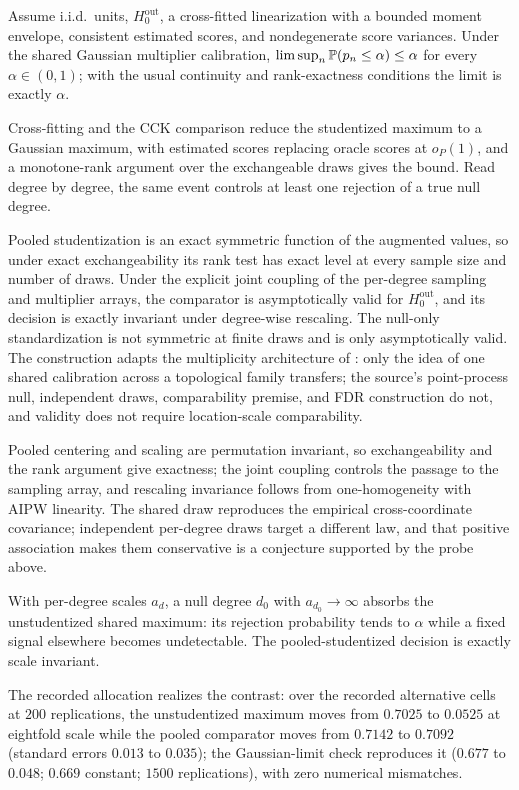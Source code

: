 \begin{theorem}
\label{thm:mult-fwer}
Assume i.i.d.\ units, $H_0^{\mathrm{out}}$, a cross-fitted linearization with a bounded moment envelope, consistent estimated scores, and nondegenerate score variances. Under the shared Gaussian multiplier calibration, $\limsup_n\mathbb{P}(p_n\le\alpha)\le\alpha$ for every $\alpha\in(0,1)$; with the usual continuity and rank-exactness conditions the limit is exactly $\alpha$.
\end{theorem}
Cross-fitting and the CCK comparison reduce the studentized maximum to a Gaussian maximum, with estimated scores replacing oracle scores at $o_P(1)$, and a monotone-rank argument over the exchangeable draws gives the bound. Read degree by degree, the same event controls at least one rejection of a true null degree.

\begin{theorem}
\label{thm:mult-comparator}
Pooled studentization is an exact symmetric function of the augmented values, so under exact exchangeability its rank test has exact level at every sample size and number of draws. Under the explicit joint coupling of the per-degree sampling and multiplier arrays, the comparator is asymptotically valid for $H_0^{\mathrm{out}}$, and its decision is exactly invariant under degree-wise rescaling. The null-only standardization is not symmetric at finite draws and is only asymptotically valid. The construction adapts the multiplicity architecture of \citet{vejdemo_mukherjee_2022}: only the idea of one shared calibration across a topological family transfers; the source's point-process null, independent draws, comparability premise, and FDR construction do not, and validity does not require location-scale comparability.
\end{theorem}
Pooled centering and scaling are permutation invariant, so exchangeability and the rank argument give exactness; the joint coupling controls the passage to the sampling array, and rescaling invariance follows from one-homogeneity with AIPW linearity. The shared draw reproduces the empirical cross-coordinate covariance; independent per-degree draws target a different law, and that positive association makes them conservative is a conjecture supported by the probe above.

\begin{theorem}
\label{thm:mult-power}
With per-degree scales $a_d$, a null degree $d_0$ with $a_{d_0}\to\infty$ absorbs the unstudentized shared maximum: its rejection probability tends to $\alpha$ while a fixed signal elsewhere becomes undetectable. The pooled-studentized decision is exactly scale invariant.
\end{theorem}
The recorded allocation realizes the contrast: over the recorded alternative cells at $200$ replications, the unstudentized maximum moves from $0.7025$ to $0.0525$ at eightfold scale while the pooled comparator moves from $0.7142$ to $0.7092$ (standard errors $0.013$ to $0.035$); the Gaussian-limit check reproduces it ($0.677$ to $0.048$; $0.669$ constant; $1500$ replications), with zero numerical mismatches.

